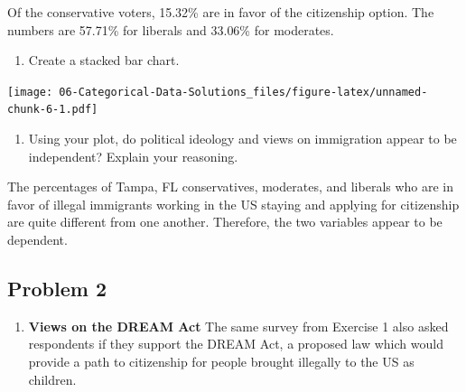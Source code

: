 \documentclass[
]{book}
\newenvironment{Shaded}{\begin{snugshade}}{\end{snugshade}}
\newcommand{\DataTypeTok}[1]{\textcolor[rgb]{0.13,0.29,0.53}{#1}}
\newcommand{\KeywordTok}[1]{\textcolor[rgb]{0.13,0.29,0.53}{\textbf{#1}}}
\newcommand{\NormalTok}[1]{#1}
\newcommand{\OperatorTok}[1]{\textcolor[rgb]{0.81,0.36,0.00}{\textbf{#1}}}
\newcommand{\StringTok}[1]{\textcolor[rgb]{0.31,0.60,0.02}{#1}}
\providecommand{\tightlist}{%
  \setlength{\itemsep}{0pt}\setlength{\parskip}{0pt}}
\begin{document}
Of the conservative voters, 15.32\% are in favor of the citizenship option. The numbers are 57.71\% for liberals and 33.06\% for moderates.

\begin{enumerate}
\def\labelenumi{\alph{enumi}.}
\setcounter{enumi}{6}
\tightlist
\item
  Create a stacked bar chart.
\end{enumerate}

\begin{Shaded}
\end{Shaded}

\texttt{[image: 06-Categorical-Data-Solutions\_files/figure-latex/unnamed-chunk-6-1.pdf]}

\begin{enumerate}
\def\labelenumi{\alph{enumi}.}
\setcounter{enumi}{7}
\tightlist
\item
  Using your plot, do political ideology and views on immigration appear to be independent? Explain your reasoning.
\end{enumerate}

The percentages of Tampa, FL conservatives, moderates, and liberals who are in favor of illegal immigrants working in the US staying and applying for citizenship are quite different from one another. Therefore, the two variables appear to be dependent.

\pagebreak

\hypertarget{problem-2-5}{%
\subsection{Problem 2}\label{problem-2-5}}

\begin{enumerate}
\def\labelenumi{\arabic{enumi}.}
\setcounter{enumi}{1}
\tightlist
\item
  \textbf{Views on the DREAM Act} The same survey from Exercise 1 also asked respondents if they support the DREAM Act, a proposed law which would provide a path to citizenship for people brought illegally to the US as children.
\end{enumerate}
\end{document}
